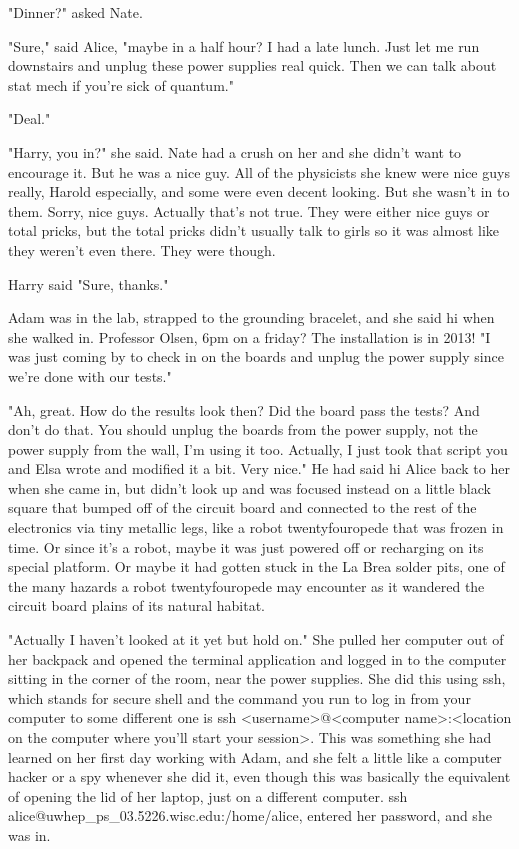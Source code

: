 "Dinner?" asked Nate. 

"Sure," said Alice, "maybe in a half hour? I had a late lunch. Just let me run downstairs and unplug these power supplies real quick. Then we can talk about stat mech if you're sick of quantum." 

"Deal." 

"Harry, you in?" she said. Nate had a crush on her and she didn't want to encourage it. But he was a nice guy. All of the physicists she knew were nice guys really, Harold especially, and some were even decent looking. But she wasn't in to them. Sorry, nice guys. Actually that's not true. They were either nice guys or total pricks, but the total pricks didn't usually talk to girls so it was almost like they weren't even there. They were though. 

Harry said "Sure, thanks." 

\mypause

Adam was in the lab, strapped to the grounding bracelet, and she said hi when she walked in. Professor Olsen, 6pm on a friday? The installation is in 2013! "I was just coming by to check in on the boards and unplug the power supply since we're done with our tests."

"Ah, great. How do the results look then? Did the board pass the tests? And don't do that. You should unplug the boards from the power supply, not the power supply from the wall, I'm using it too. Actually, I just took that script you and Elsa wrote and modified it a bit. Very nice." He had said hi Alice back to her when she came in, but didn't look up and was focused instead on a little black square that bumped off of the circuit board and connected to the rest of the electronics via tiny metallic legs, like a robot twentyfouropede that was frozen in time. Or since it's a robot, maybe it was just powered off or recharging on its special platform. Or maybe it had gotten stuck in the La Brea solder pits, one of the many hazards a robot twentyfouropede may encounter as it wandered the circuit board plains of its natural habitat. 

"Actually I haven't looked at it yet but hold on." She pulled her computer out of her backpack and opened the terminal application and logged in to the computer sitting in the corner of the room, near the power supplies. She did this using ssh, which stands for secure shell and the command you run to log in from your computer to some different one is {\ttfamily ssh <username>@<computer name>:<location on the computer where you'll start your session>}. This was something she had learned on her first day working with Adam, and she felt a little like a computer hacker or a spy whenever she did it, even though this was basically the equivalent of opening the lid of her laptop, just on a different computer. {\ttfamily ssh alice\-@uwhep\_ps\_03\-.5226.wisc.edu:\-/home/alice}, entered her password, and she was in.

